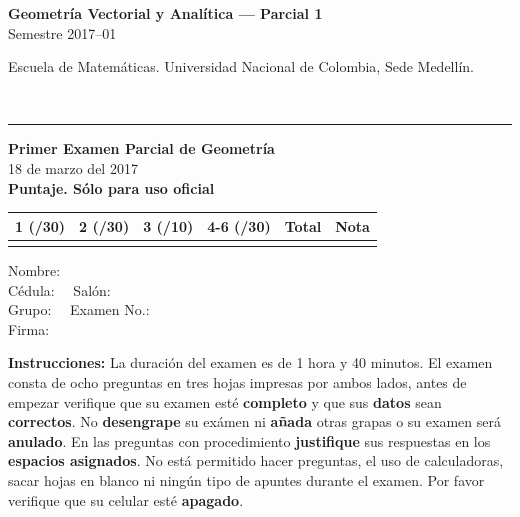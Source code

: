 \documentclass[11pt]{article}
\begin{document}
\noindent
\begin{minipage}[t]{0.6\linewidth}
{\small\bfseries Geometría Vectorial y Analítica --- Parcial 1}\\
{\small Semestre 2017--01}
\end{minipage}%
\hfill
\begin{minipage}[t]{0.35\linewidth}
\raggedleft\small Escuela de Matemáticas. Universidad Nacional de Colombia, Sede Medellín.
\end{minipage}\\[2pt]
\rule{\linewidth}{0.6pt}

\noindent
\begin{minipage}[t]{0.54\linewidth}
\textbf{Primer Examen Parcial de Geometría}\\
18 de marzo del 2017\\[6pt]
\textbf{Puntaje. Sólo para uso oficial}

\small
\begin{tabular}{|c|c|c|c|c|c|}
\hline
1 (/30) & 2 (/30) & 3 (/10) & 4-6 (/30) & Total & Nota \\
\hline
 & & & & & \\
\hline
\end{tabular}
\end{minipage}%
\begin{minipage}[t]{0.44\linewidth}
Nombre: \underline{\hspace{4.8cm}}\\[8pt]
Cédula: \underline{\hspace{1.8cm}}\ \ Salón: \underline{\hspace{1.2cm}}\\[8pt]
Grupo: \underline{\hspace{1.8cm}}\ \ Examen No.: \underline{\hspace{1.6cm}}\\[8pt]
Firma: \underline{\hspace{4.8cm}}
\end{minipage}

\vspace{10pt}
\textbf{Instrucciones:} La duración del examen es de 1 hora y 40 minutos. El examen consta de ocho preguntas en tres hojas impresas por ambos lados, antes de empezar verifique que su examen esté \textbf{completo} y que sus \textbf{datos} sean \textbf{correctos}. No \textbf{desengrape} su exámen ni \textbf{añada} otras grapas o su examen será \textbf{anulado}. En las preguntas con procedimiento \textbf{justifique} sus respuestas en los \textbf{espacios asignados}. No está permitido hacer preguntas, el uso de calculadoras, sacar hojas en blanco ni ningún tipo de apuntes durante el examen. Por favor verifique que su celular esté \textbf{apagado}.
\end{document}
